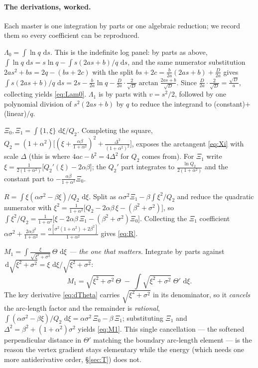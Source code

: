 \documentclass[11pt]{article}
\newcommand{\atan}{\operatorname{arctan}}
\newcommand{\dd}{\,\mathrm{d}}
\begin{document}
\paragraph{The derivations, worked.}  Each master is one integration by parts or one
algebraic reduction; we record them so every coefficient can be reproduced.

\emph{$\Lambda_0=\int\ln q\,\dd s$.}  This is the indefinite log panel: by parts as
above, $\int\ln q\,\dd s = s\ln q-\int s(2as+b)/q\,\dd s$, and the same numerator
substitution $2as^2+bs=2q-(bs+2c)$ with the split
$bs+2c=\tfrac{b}{2a}(2as+b)+\tfrac{D}{2a}$ gives
$\int s(2as+b)/q\,\dd s = 2s-\tfrac{b}{2a}\ln q-\tfrac{D}{2a}\cdot
\tfrac{2}{\sqrt D}\atan\tfrac{2as+b}{\sqrt D}$.  Since
$\tfrac{D}{2a}\cdot\tfrac{2}{\sqrt D}=\tfrac{\sqrt D}{a}$, collecting yields
\eqref{eq:Lam0}.  $\Lambda_1$ is by parts with $v=s^2/2$, followed by one polynomial
division of $s^2(2as+b)$ by $q$ to reduce the integrand to
(constant)$+$(linear)$/q$.

\emph{$\Xi_0,\Xi_1=\int\{1,\xi\}\,\dd\xi/Q_2$.}  Completing the square,
$Q_2=(1{+}\alpha^2)\bigl[(\xi+\tfrac{\alpha\beta}{1+\alpha^2})^2+
\tfrac{\Delta^2}{(1+\alpha^2)^2}\bigr]$, exposes the arctangent \eqref{eq:Xi} with
scale $\Delta$ (this is where $4ac-b^2=4\Delta^2$ for $Q_2$ comes from).  For $\Xi_1$
write $\xi=\tfrac{1}{2(1+\alpha^2)}\bigl[Q_2'(\xi)-2\alpha\beta\bigr]$; the $Q_2'$ part
integrates to $\tfrac{\ln Q_2}{2(1+\alpha^2)}$ and the constant part to
$-\tfrac{\alpha\beta}{1+\alpha^2}\Xi_0$.

\emph{$R=\int\xi(\alpha\sigma^2-\beta\xi)/Q_2\,\dd\xi$.}  Split as
$\alpha\sigma^2\Xi_1-\beta\int\xi^2/Q_2$ and reduce the quadratic numerator with
$\xi^2=\tfrac{1}{1+\alpha^2}\bigl[Q_2-2\alpha\beta\,\xi-(\beta^2{+}\sigma^2)\bigr]$, so
$\int\xi^2/Q_2=\tfrac{1}{1+\alpha^2}\bigl[\xi-2\alpha\beta\,\Xi_1
-(\beta^2{+}\sigma^2)\Xi_0\bigr]$.  Collecting the $\Xi_1$ coefficient
$\alpha\sigma^2+\tfrac{2\alpha\beta^2}{1+\alpha^2}
=\tfrac{\alpha[\sigma^2(1+\alpha^2)+2\beta^2]}{1+\alpha^2}$ gives \eqref{eq:R}.

\emph{$M_1=\int\tfrac{\xi}{\sqrt{\xi^2+\sigma^2}}\,\Theta\,\dd\xi$ --- the one that
matters.}  Integrate by parts against
$\dd\!\sqrt{\xi^2+\sigma^2}=\xi\,\dd\xi/\sqrt{\xi^2+\sigma^2}$:
\[
  M_1 = \sqrt{\xi^2+\sigma^2}\,\Theta
        \;-\;\int \sqrt{\xi^2+\sigma^2}\;\Theta'\,\dd\xi .
\]
The key derivative \eqref{eq:dTheta} carries $\sqrt{\xi^2+\sigma^2}$ in its
denominator, so it \emph{cancels} the arc-length factor and the remainder is
\emph{rational},
$\int(\alpha\sigma^2-\beta\xi)/Q_2\,\dd\xi=\alpha\sigma^2\,\Xi_0-\beta\,\Xi_1$;
substituting $\Xi_1$ and $\Delta^2=\beta^2+(1{+}\alpha^2)\sigma^2$ yields
\eqref{eq:M1}.  This single cancellation --- the softened perpendicular distance in
$\Theta'$ matching the boundary arc-length element --- is the reason the vertex
gradient stays elementary while the energy (which needs one more antiderivative order,
\S\ref{sec:T}) does not.
\end{document}

